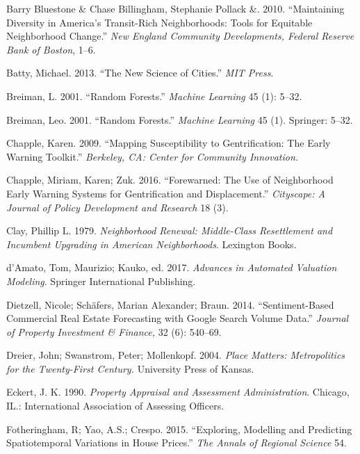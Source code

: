 \documentclass[12pt,]{article}
\begin{document}
\leavevmode\hypertarget{ref-Pollack2010}{}%
Barry Bluestone \& Chase Billingham, Stephanie Pollack \&. 2010.
``Maintaining Diversity in America's Transit-Rich Neighborhoods: Tools
for Equitable Neighborhood Change.'' \emph{New England Community
Developments, Federal Reserve Bank of Boston}, 1--6.

\leavevmode\hypertarget{ref-Batty2013}{}%
Batty, Michael. 2013. ``The New Science of Cities.'' \emph{MIT Press}.

\leavevmode\hypertarget{ref-Breiman2001}{}%
Breiman, L. 2001. ``Random Forests.'' \emph{Machine Learning} 45 (1):
5--32.

\leavevmode\hypertarget{ref-breiman2001random}{}%
Breiman, Leo. 2001. ``Random Forests.'' \emph{Machine Learning} 45 (1).
Springer: 5--32.

\leavevmode\hypertarget{ref-Chapple2009}{}%
Chapple, Karen. 2009. ``Mapping Susceptibility to Gentrification: The
Early Warning Toolkit.'' \emph{Berkeley, CA: Center for Community
Innovation.}

\leavevmode\hypertarget{ref-Chapple2016}{}%
Chapple, Miriam, Karen; Zuk. 2016. ``Forewarned: The Use of Neighborhood
Early Warning Systems for Gentrification and Displacement.''
\emph{Cityscape: A Journal of Policy Development and Research} 18 (3).

\leavevmode\hypertarget{ref-Clay1979}{}%
Clay, Phillip L. 1979. \emph{Neighborhood Renewal: Middle-Class
Resettlement and Incumbent Upgrading in American Neighborhoods}.
Lexington Books.

\leavevmode\hypertarget{ref-Springer2017}{}%
d'Amato, Tom, Maurizio; Kauko, ed. 2017. \emph{Advances in Automated
Valuation Modeling}. Springer International Publishing.

\leavevmode\hypertarget{ref-Dietzell2014}{}%
Dietzell, Nicole; Schäfers, Marian Alexander; Braun. 2014.
``Sentiment-Based Commercial Real Estate Forecasting with Google Search
Volume Data.'' \emph{Journal of Property Investment \& Finance,} 32 (6):
540--69.

\leavevmode\hypertarget{ref-Dreier2004}{}%
Dreier, John; Swanstrom, Peter; Mollenkopf. 2004. \emph{Place Matters:
Metropolitics for the Twenty-First Century.} University Press of Kansas.

\leavevmode\hypertarget{ref-Eckert1990}{}%
Eckert, J. K. 1990. \emph{Property Appraisal and Assessment
Administration}. Chicago, IL.: International Association of Assessing
Officers.

\leavevmode\hypertarget{ref-Fotheringham2015}{}%
Fotheringham, R; Yao, A.S.; Crespo. 2015. ``Exploring, Modelling and
Predicting Spatiotemporal Variations in House Prices.'' \emph{The Annals
of Regional Science} 54.
\end{document}
